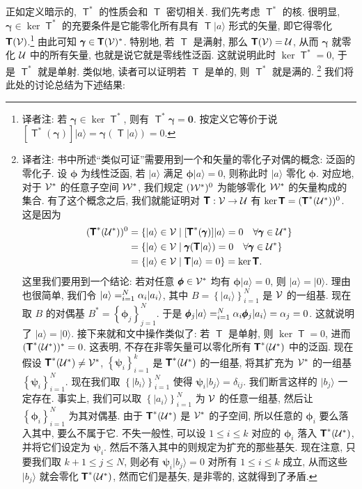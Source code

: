 \documentclass[lang=cn,zihao=-4,twoside,fontset=none]{textbook}
\let\sum\relax
\newcommand{\bsf}[1]{{\mathop{\pmb{\mathsf{#1}}}}}
\def\eq#1{\[\begin{aligned}{}#1\end{aligned}\]}
\newcommand{\Set}[1]{\left\{#1\right\}}
\renewcommand{\ket}[1]{| #1 \rangle}
\begin{document}
正如定义暗示的, $\bsf T^*$ 的性质会和 $\bsf{T}$ 密切相关. 我们先考虑 $\bsf{T}^*$ 的核. 很明显, $\pmb\gamma\in\ker\bsf{T}^*$ 的充要条件是它能零化所有具有 $\bsf{T}\ket{a}$ 形式的矢量, 即它得零化 $\bsf{T}(\mV)$.\footnote{译者注: 若 $\pmb{\gamma}\in\ker\bsf{T}^*$, 则有 $\bsf{T}^*\pmb\gamma=\pmb 0$. 按定义它等价于说 $[\bsf{T}^*(\pmb\gamma)]\ket{a}=\pmb\gamma(\bsf{T}\ket{a})=0$.} 由此可知 $\pmb\gamma\in\bsf{T}(\mV)^*$. 特别地, 若 $\bsf{T}$ 是满射, 那么 $\bsf{T}(\mV)=\mU$, 从而 $\pmb\gamma$ 就零化 ${\mathcal U}$ 中的所有矢量, 也就是说它就是零线性泛函. 这就说明此时 $\ker\bsf{T}^*=0$, 于是 $\bsf{T}^*$ 就是单射. 类似地, 读者可以证明若 $\bsf T$ 是单的, 则 $\bsf{T}^*$ 就是满的. \footnote{译者注: 书中所述``类似可证''需要用到一个和矢量的零化子对偶的概念: 泛函的零化子. 设 $\pmb\phi$ 为线性泛函, 若 $\ket{a}$ 满足 $\pmb\phi\ket{a}=0$, 则称此时 $\ket{a}$ 零化 $\pmb\phi$. 对应地, 对于 ${\mathcal V}^*$ 的任意子空间 ${\mathcal W}^*$, 我们规定 $({\mathcal W}^*)^0$ 为能够零化 ${\mathcal W}^*$ 的矢量构成的集合. 有了这个概念之后, 我们就能证明对 $\bsf T:\mV\to\mU$ 有 $\ker\bsf{T}=(\bsf{T}^*(\mU^*))^0$. 这是因为 
\eq{
    (\bsf{T}^*(\mU^*))^0&=\Set{\ket{a}\in\mV\mid [\bsf{T}^*(\pmb\gamma)]\ket{a}=0\quad \forall\pmb\gamma\in\mU^*}\\
    &=\Set{\ket{a}\in\mV\mid \pmb\gamma(\bsf{T}\ket{a})=0\quad\forall\pmb\gamma\in\mU^*}\\
    &=\Set{\ket{a}\in\mV\mid \bsf T\ket{a}=0}=\ker\bsf{T}.
}
这里我们要用到一个结论: 若对任意 $\pmb\phi\in{\mathcal V}^*$ 均有 $\pmb\phi\ket{a}=0$, 则 $\ket{a}=\ket{0}$. 理由也很简单, 我们令 $\ket{a}=\sum_{i=1}^N\alpha_i\ket{a_i}$, 其中 $B=\Set{\ket{a_i}}_{i=1}^N$ 是 ${\mathcal V}$ 的一组基. 现在取 $B$ 的对偶基 $B^*=\Set{\pmb\phi_j}_{j=1}^N$. 于是 $\pmb\phi_j\ket{a}=\sum_{i=1}^N\alpha_i{\pmb\phi_j\ket{a_i}}=\alpha_j=0$. 这就说明了 $\ket{a}=\ket{0}$. 接下来就和文中操作类似了: 若 $\bsf{T}$ 是单射, 则 $\ker\bsf{T}=0$, 进而 $(\bsf{T}^*(\mU^*))^*=0$. 这表明, 不存在非零矢量可以零化所有 $\bsf{T}^*(\mU^*)$ 中的泛函. 现在假设 $\bsf{T}^*(\mU^*)\neq\mV^*$, $\Set{\pmb\psi_i}_{i=1}^k$ 是 $\bsf{T}^*(\mU^*)$ 的一组基, 将其扩充为 ${\mathcal V}^*$ 的一组基 $\Set{\pmb\psi_i}_{i=1}^N$. 现在我们取 $\Set{\ket{b_i}}_{i=1}^N$ 使得 $\pmb\psi_i\ket{b_j}=\delta_{ij}$. 我们断言这样的 $\ket{b_j}$ 一定存在. 事实上, 我们可以取 $\Set{\ket{a_i}}_{i=1}^N$ 为 ${\mathcal V}$ 的任意一组基, 然后让 $\Set{\pmb\phi_i}_{i=1}^N$ 为其对偶基. 由于 $\bsf{T}^*(\mU^*)$ 是 ${\mathcal V}^*$ 的子空间, 所以任意的 $\pmb\phi_i$ 要么落入其中, 要么不属于它. 不失一般性, 可以设 $1\leq i\leq k$ 对应的 $\pmb\phi_i$ 落入 $\bsf{T}^*(\mU^*)$, 并将它们设定为 $\pmb\psi_i$. 然后不落入其中的则规定为扩充的那些基矢. 现在注意, 只要我们取 $k+1\leq j\leq N$, 则必有 $\pmb{\psi}_i\ket{b_j}=0$ 对所有 $1\leq i\leq k$ 成立, 从而这些 $\ket{b_j}$ 就会零化 $\bsf{T}^*(\mU^*)$, 然而它们是基矢, 是非零的, 这就得到了矛盾.  
} 
我们将此处的讨论总结为下述结果:
\end{document}

